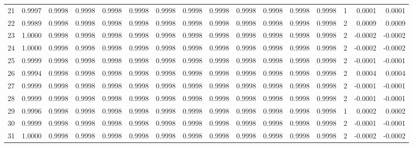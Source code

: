 \begin{tabular}{lrrrrrrrrrrrrrrr}
21  &      0.9997 &  0.9998 &  0.9998 &  0.9998 &  0.9998 &  0.9998 &  0.9998 &  0.9998 &  0.9998 &  0.9998 &   0.9998 &     0.9998 &      1 &                    0.0001 &                     0.0001 \\
22  &      0.9989 &  0.9998 &  0.9998 &  0.9998 &  0.9998 &  0.9998 &  0.9998 &  0.9998 &  0.9998 &  0.9998 &   0.9998 &     0.9998 &      2 &                    0.0009 &                     0.0009 \\
23  &      1.0000 &  0.9998 &  0.9998 &  0.9998 &  0.9998 &  0.9998 &  0.9998 &  0.9998 &  0.9998 &  0.9998 &   0.9998 &     0.9998 &      2 &                   -0.0002 &                    -0.0002 \\
24  &      1.0000 &  0.9998 &  0.9998 &  0.9998 &  0.9998 &  0.9998 &  0.9998 &  0.9998 &  0.9998 &  0.9998 &   0.9998 &     0.9998 &      2 &                   -0.0002 &                    -0.0002 \\
25  &      0.9999 &  0.9998 &  0.9998 &  0.9998 &  0.9998 &  0.9998 &  0.9998 &  0.9998 &  0.9998 &  0.9998 &   0.9998 &     0.9998 &      2 &                   -0.0001 &                    -0.0001 \\
26  &      0.9994 &  0.9998 &  0.9998 &  0.9998 &  0.9998 &  0.9998 &  0.9998 &  0.9998 &  0.9998 &  0.9998 &   0.9998 &     0.9998 &      2 &                    0.0004 &                     0.0004 \\
27  &      0.9999 &  0.9998 &  0.9998 &  0.9998 &  0.9998 &  0.9998 &  0.9998 &  0.9998 &  0.9998 &  0.9998 &   0.9998 &     0.9998 &      2 &                   -0.0001 &                    -0.0001 \\
28  &      0.9999 &  0.9998 &  0.9998 &  0.9998 &  0.9998 &  0.9998 &  0.9998 &  0.9998 &  0.9998 &  0.9998 &   0.9998 &     0.9998 &      2 &                   -0.0001 &                    -0.0001 \\
29  &      0.9996 &  0.9998 &  0.9998 &  0.9998 &  0.9998 &  0.9998 &  0.9998 &  0.9998 &  0.9998 &  0.9998 &   0.9998 &     0.9998 &      1 &                    0.0002 &                     0.0002 \\
30  &      0.9999 &  0.9998 &  0.9998 &  0.9998 &  0.9998 &  0.9998 &  0.9998 &  0.9998 &  0.9998 &  0.9998 &   0.9998 &     0.9998 &      2 &                   -0.0001 &                    -0.0001 \\
31  &      1.0000 &  0.9998 &  0.9998 &  0.9998 &  0.9998 &  0.9998 &  0.9998 &  0.9998 &  0.9998 &  0.9998 &   0.9998 &     0.9998 &      2 &                   -0.0002 &                    -0.0002 \\

\end{tabular}
